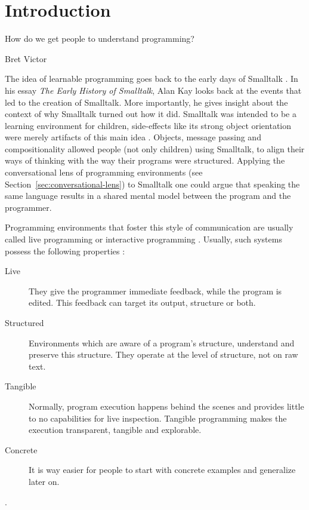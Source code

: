 \chapter[Introduction]{Introduction }
\epigraph{How do we get people to understand programming?}{Bret Victor}

The idea of learnable programming \cite{victor_inventing_2012} goes back to the early days of Smalltalk \cite{kay_early_1993}.
In his essay \emph{The Early History of Smalltalk}, Alan Kay looks back at the events that led to the creation of Smalltalk.
More importantly, he gives insight about the context of why Smalltalk turned out how it did.
Smalltalk was intended to be a learning environment for children, side-effects like its strong object orientation were merely artifacts of this main idea \cite{kay_early_1993}.
Objects, message passing and compositionality allowed people (not only children) using Smalltalk, to align their ways of thinking with the way their programs were structured.
Applying the conversational lens of programming environments (see Section~\ref{sec:conversational-lens}) to Smalltalk one could argue that speaking the same language results in a shared mental model between the program and the programmer.

Programming environments that foster this style of communication are usually called live programming\cite{aguiar_live_2019, church_liveness_2010} or interactive programming \cite{czaplicki_interactive_2013, mccabe_towards_2023}.
Usually, such systems possess the following properties \cite{burg_1st_2013}:
\begin{description}
    \item[Live] They give the programmer immediate feedback, while the program is edited. This feedback can target its output, structure or both.
    \item[Structured] Environments which are aware of a program's structure, understand and preserve this structure. They operate at the level of structure, not on raw text.
    \item[Tangible] Normally, program execution happens behind the scenes and provides little to no capabilities for live inspection. Tangible programming makes the execution transparent, tangible and explorable.
    \item[Concrete] It is way easier for people to start with concrete examples and generalize later on.
\end{description}

.

